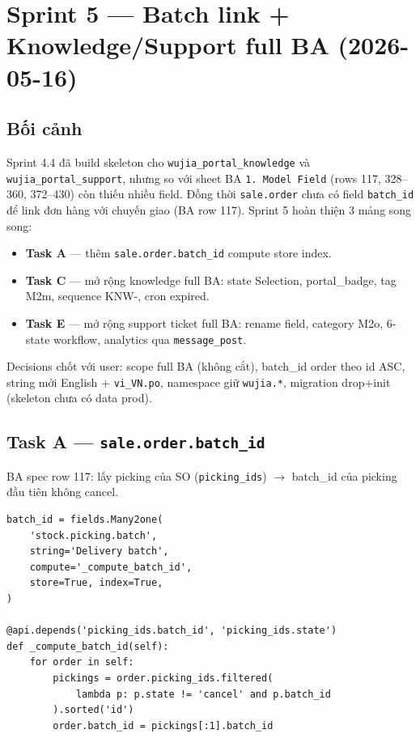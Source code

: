 \chapter{Sprint 5 --- Batch link + Knowledge/Support full BA (2026-05-16)}

\section{Bối cảnh}

Sprint 4.4 đã build skeleton cho \texttt{wujia\_portal\_knowledge} và \texttt{wujia\_portal\_support}, nhưng so với sheet BA \texttt{1. Model Field} (rows 117, 328--360, 372--430) còn thiếu nhiều field. Đồng thời \texttt{sale.order} chưa có field \texttt{batch\_id} để link đơn hàng với chuyến giao (BA row 117). Sprint 5 hoàn thiện 3 mảng song song:

\begin{itemize}[leftmargin=*]
    \item \textbf{Task A} --- thêm \texttt{sale.order.batch\_id} compute store index.
    \item \textbf{Task C} --- mở rộng knowledge full BA: state Selection, portal\_badge, tag M2m, sequence KNW-, cron expired.
    \item \textbf{Task E} --- mở rộng support ticket full BA: rename field, category M2o, 6-state workflow, analytics qua \texttt{message\_post}.
\end{itemize}

Decisions chốt với user: scope full BA (không cắt), batch\_id order theo id ASC, string mới English + \texttt{vi\_VN.po}, namespace giữ \texttt{wujia.*}, migration drop+init (skeleton chưa có data prod).

\section{Task A --- \texttt{sale.order.batch\_id}}

BA spec row 117: lấy picking của SO (\texttt{picking\_ids}) $\rightarrow$ batch\_id của picking đầu tiên không cancel.

\begin{lstlisting}[style=python]
batch_id = fields.Many2one(
    'stock.picking.batch',
    string='Delivery batch',
    compute='_compute_batch_id',
    store=True, index=True,
)

@api.depends('picking_ids.batch_id', 'picking_ids.state')
def _compute_batch_id(self):
    for order in self:
        pickings = order.picking_ids.filtered(
            lambda p: p.state != 'cancel' and p.batch_id
        ).sorted('id')
        order.batch_id = pickings[:1].batch_id
\end{lstlisting}

